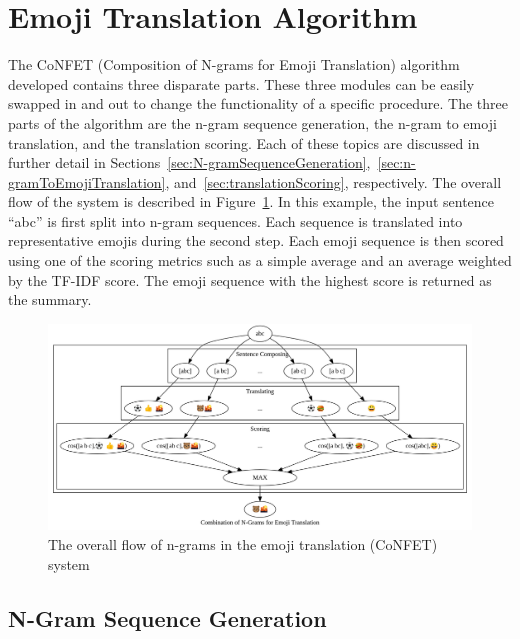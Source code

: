 \documentclass{article}[10]
\begin{document}
\section{Emoji Translation Algorithm\label{sec:EmojiTranslationAlgorithm}}

The CoNFET (Composition of N-grams for Emoji Translation) algorithm developed
contains three disparate parts. These three modules can be easily swapped in and
out to change the functionality of a specific procedure. The three parts of the
algorithm are the n-gram sequence generation, the n-gram to emoji translation,
and the translation scoring. Each of these topics are discussed in further
detail in
Sections~\ref{sec:N-gramSequenceGeneration},~\ref{sec:n-gramToEmojiTranslation},
and~\ref{sec:translationScoring}, respectively. The overall flow of the system
is described in Figure~\ref{fig:flow}. In this example, the input sentence
``abc'' is first split into n-gram sequences. Each sequence is translated into
representative emojis during the second step. Each emoji sequence is then scored
using one of the scoring metrics such as a simple average and an average
weighted by the TF-IDF score. The emoji sequence with the highest score is
returned as the summary.

\begin{figure}[h]
  \begin{center}
    \includegraphics[width=1.0\textwidth]{figures/flow.png}
    \caption{The overall flow of n-grams in the emoji translation
      (CoNFET) system\label{fig:flow}}
  \end{center}
\end{figure}

\subsection{N-Gram Sequence Generation\label{sec:N-gramSequenceGeneration}}
\end{document}

